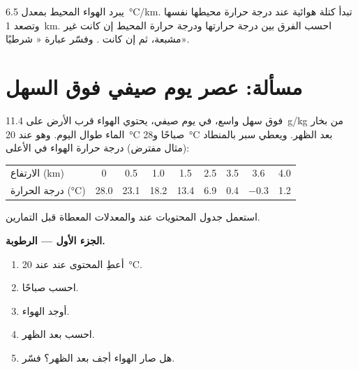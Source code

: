 \begin{exercise}[$\star\star\star$]\label{exo:g10:why-clouds-form:15}
يبرد الهواء المحيط بمعدل \qty{6.5}{\degreeCelsius/km}. تبدأ كتلة هوائية عند
درجة حرارة محيطها نفسها وتصعد \qty{1}{km}. احسب الفرق بين درجة حرارتها ودرجة
حرارة المحيط إن كانت غير مشبعة، ثم إن كانت . وفسّر عبارة «
شرطيًا».
\end{exercise}

\section{مسألة: عصر يوم صيفي فوق السهل}

\begin{problem}
\label{pb:g10:why-clouds-form:1}
فوق سهل واسع، في يوم صيفي، يحتوي الهواء قرب الأرض على
\qty{11.4}{g/kg} من بخار الماء طوال اليوم. وهو عند \qty{20}{\degreeCelsius}
صباحًا و\qty{28}{\degreeCelsius} بعد الظهر. ويعطي سبر بالمنطاد (مثال
مفترض) درجة حرارة الهواء في الأعلى:

\begin{center}
\small
\begin{tabular}{l*{8}{c}}
\hline
الارتفاع (km) & 0 & 0.5 & 1.0 & 1.5 & 2.5 & 3.5 & 3.6 & 4.0 \\
درجة الحرارة (\unit{\degreeCelsius}) & 28.0 & 23.1 & 18.2 & 13.4 & 6.9 & 0.4 & $-0.3$ & 1.2 \\
\hline
\end{tabular}
\end{center}

\noindent استعمل جدول المحتويات عند  والمعدلات المعطاة قبل
التمارين.

\medskip
\noindent\textbf{الجزء الأول --- الرطوبة.}
\begin{enumerate}
  \item أعطِ المحتوى عند  عند \qty{20}{\degreeCelsius}.
  \item احسب  صباحًا.
  \item أوجد  الهواء.
  \item احسب  بعد الظهر.
  \item هل صار الهواء أجف بعد الظهر؟ فسّر.
\end{enumerate}


\end{problem}
